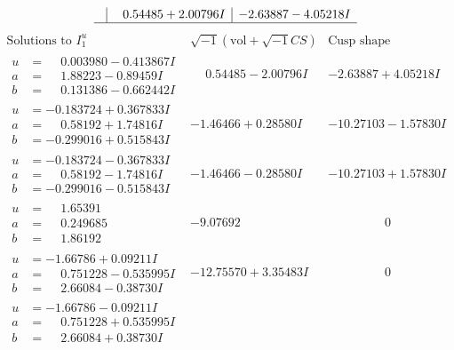 \documentclass[1p]{elsarticle_modified}
\theoremstyle{definition}
\newcommand{\I}{\sqrt{-1}}
\begin{document}
$$\begin{array}{c|c|c}
 & \phantom{-}0.54485 + 2.00796 I & -2.63887 - 4.05218 I\\
 \hline 
 \end{array}$$\newpage$$\begin{array}{c|c|c}  
\text{Solutions to }I^u_{1}& \I (\text{vol} + \sqrt{-1}CS) & \text{Cusp shape}\\
 \hline 
\begin{aligned}
u &= \phantom{-}0.003980 - 0.413867 I \\
a &= \phantom{-}1.88223 - 0.89459 I \\
b &= \phantom{-}0.131386 - 0.662442 I\end{aligned}
 & \phantom{-}0.54485 - 2.00796 I & -2.63887 + 4.05218 I \\ \hline\begin{aligned}
u &= -0.183724 + 0.367833 I \\
a &= \phantom{-}0.58192 + 1.74816 I \\
b &= -0.299016 + 0.515843 I\end{aligned}
 & -1.46466 + 0.28580 I & -10.27103 - 1.57830 I \\ \hline\begin{aligned}
u &= -0.183724 - 0.367833 I \\
a &= \phantom{-}0.58192 - 1.74816 I \\
b &= -0.299016 - 0.515843 I\end{aligned}
 & -1.46466 - 0.28580 I & -10.27103 + 1.57830 I \\ \hline\begin{aligned}
u &= \phantom{-}1.65391\phantom{ +0.000000I} \\
a &= \phantom{-}0.249685\phantom{ +0.000000I} \\
b &= \phantom{-}1.86192\phantom{ +0.000000I}\end{aligned}
 & -9.07692\phantom{ +0.000000I} & \phantom{-0.000000 } 0 \\ \hline\begin{aligned}
u &= -1.66786 + 0.09211 I \\
a &= \phantom{-}0.751228 - 0.535995 I \\
b &= \phantom{-}2.66084 - 0.38730 I\end{aligned}
 & -12.75570 + 3.35483 I & \phantom{-0.000000 } 0 \\ \hline\begin{aligned}
u &= -1.66786 - 0.09211 I \\
a &= \phantom{-}0.751228 + 0.535995 I \\
b &= \phantom{-}2.66084 + 0.38730 I\end{aligned}

\end{array}$$
\end{document}
